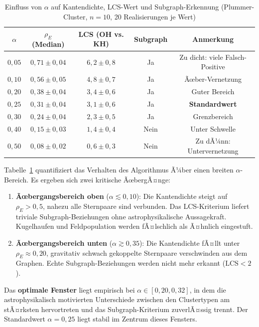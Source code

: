 ﻿\documentclass[a4paper,12pt]{report}
\theoremstyle{definition}
\begin{document}
\begin{table}[H]
\centering
\caption{Einfluss von $\alpha$ auf Kantendichte, LCS-Wert und Subgraph-Erkennung (Plummer-Cluster, $n = 10$, 20 Realisierungen je Wert)}
\label{tab:alpha}
\begin{tabular}{ccccc}
\toprule
$\alpha$ & $\rho_E$ (Median) & LCS (OH vs. KH) & Subgraph & Anmerkung \\
\midrule
$0{,}05$ & $0{,}71 \pm 0{,}04$ & $6{,}2 \pm 0{,}8$ & Ja  & Zu dicht: viele Falsch-Positive \\
$0{,}10$ & $0{,}56 \pm 0{,}05$ & $4{,}8 \pm 0{,}7$ & Ja  & Ãœber-Vernetzung \\
$0{,}20$ & $0{,}38 \pm 0{,}04$ & $3{,}4 \pm 0{,}6$ & Ja  & Guter Bereich \\
$0{,}25$ & $0{,}31 \pm 0{,}04$ & $3{,}1 \pm 0{,}6$ & Ja  & \textbf{Standardwert} \\
$0{,}30$ & $0{,}24 \pm 0{,}04$ & $2{,}3 \pm 0{,}5$ & Ja  & Grenzbereich \\
$0{,}40$ & $0{,}15 \pm 0{,}03$ & $1{,}4 \pm 0{,}4$ & Nein & Unter Schwelle \\
$0{,}50$ & $0{,}08 \pm 0{,}02$ & $0{,}6 \pm 0{,}3$ & Nein & Zu dÃ¼nn: Untervernetzung \\
\bottomrule
\end{tabular}
\end{table}

Tabelle~\ref{tab:alpha} quantifiziert das Verhalten des Algorithmus Ã¼ber einen breiten $\alpha$-Bereich. Es ergeben sich zwei kritische ÃœbergÃ¤nge:

\begin{enumerate}
    \item \textbf{Ãœbergangsbereich oben} ($\alpha \lesssim 0{,}10$): Die Kantendichte steigt auf $\rho_E > 0{,}5$, nahezu alle Sternpaare sind verbunden. Das LCS-Kriterium liefert triviale Subgraph-Beziehungen ohne astrophysikalische Aussagekraft. Kugelhaufen und Feldpopulation werden fÃ¤lschlich als Ã¤hnlich eingestuft.

    \item \textbf{Ãœbergangsbereich unten} ($\alpha \gtrsim 0{,}35$): Die Kantendichte fÃ¤llt unter $\rho_E \approx 0{,}20$, gravitativ schwach gekoppelte Sternpaare verschwinden aus dem Graphen. Echte Subgraph-Beziehungen werden nicht mehr erkannt ($\mathrm{LCS} < 2$).
\end{enumerate}

Das \textbf{optimale Fenster} liegt empirisch bei $\alpha \in [0{,}20, 0{,}32]$, in dem die astrophysikalisch motivierten Unterschiede zwischen den Clustertypen am stÃ¤rksten hervortreten und das Subgraph-Kriterium zuverlÃ¤ssig trennt. Der Standardwert $\alpha = 0{,}25$ liegt stabil im Zentrum dieses Fensters.
\end{document}
